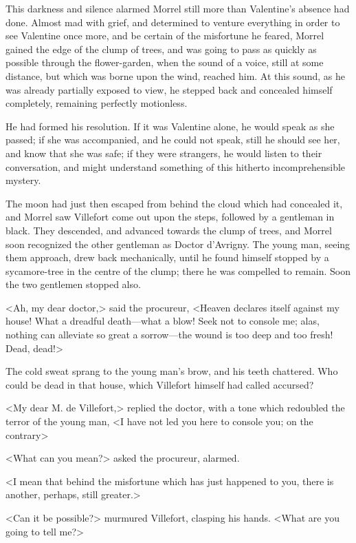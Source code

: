  This darkness and silence alarmed Morrel still more than Valentine's absence had done. Almost mad with grief, and determined to venture everything in order to see Valentine once more, and be certain of the misfortune he feared, Morrel gained the edge of the clump of trees, and was going to pass as quickly as possible through the flower-garden, when the sound of a voice, still at some distance, but which was borne upon the wind, reached him. At this sound, as he was already partially exposed to view, he stepped back and concealed himself completely, remaining perfectly motionless. 

 He had formed his resolution. If it was Valentine alone, he would speak as she passed; if she was accompanied, and he could not speak, still he should see her, and know that she was safe; if they were strangers, he would listen to their conversation, and might understand something of this hitherto incomprehensible mystery. 

 The moon had just then escaped from behind the cloud which had concealed it, and Morrel saw Villefort come out upon the steps, followed by a gentleman in black. They descended, and advanced towards the clump of trees, and Morrel soon recognized the other gentleman as Doctor d'Avrigny.  The young man, seeing them approach, drew back mechanically, until he found himself stopped by a sycamore-tree in the centre of the clump; there he was compelled to remain. Soon the two gentlemen stopped also. 

 <Ah, my dear doctor,> said the procureur, <Heaven declares itself against my house! What a dreadful death—what a blow! Seek not to console me; alas, nothing can alleviate so great a sorrow—the wound is too deep and too fresh! Dead, dead!> 

 The cold sweat sprang to the young man's brow, and his teeth chattered. Who could be dead in that house, which Villefort himself had called accursed? 

 <My dear M. de Villefort,> replied the doctor, with a tone which redoubled the terror of the young man, <I have not led you here to console you; on the contrary\longdash> 

 <What can you mean?> asked the procureur, alarmed. 

 <I mean that behind the misfortune which has just happened to you, there is another, perhaps, still greater.> 

 <Can it be possible?> murmured Villefort, clasping his hands. <What are you going to tell me?> 

